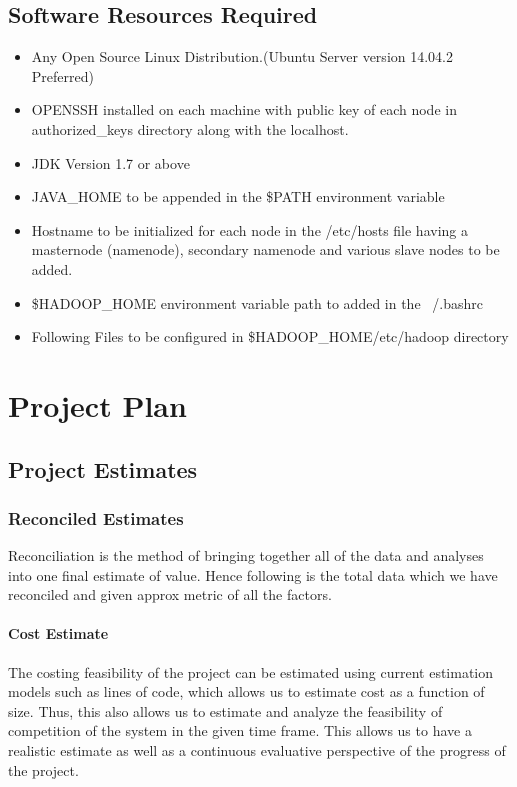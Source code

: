 \documentclass[oneside,a4paper,12pt]{report}
\begin{document}
\section{Software Resources Required}
\begin{itemize}
\item Any Open Source Linux Distribution.(Ubuntu Server version 14.04.2 Preferred)
\item OPENSSH installed on each machine with public key of each node in authorized\_keys directory along with the localhost.
\item JDK Version 1.7 or above
\item JAVA\_HOME to be appended in the \$PATH environment variable
\item Hostname to be initialized for each node in the /etc/hosts file having a masternode (namenode), secondary namenode and various slave nodes to be added.
\item \$HADOOP\_HOME environment variable path to added in the ~/.bashrc 
\item Following Files to be configured in \$HADOOP\_HOME/etc/hadoop directory
\end{itemize}

\chapter{Project Plan}

\section{Project Estimates}
             
\subsection{Reconciled Estimates}
Reconciliation is the method of bringing together all of the data and analyses into one final estimate of value. Hence following is the total data which we have reconciled and given approx metric of all the factors. \\

\subsubsection{Cost Estimate}
The costing feasibility of the project can be estimated using current estimation models such as lines of code, which allows us to estimate cost as a function of size. Thus, this also allows us to estimate and analyze the feasibility of competition of the system in the given time frame. This allows us to have a realistic estimate as well as a continuous evaluative perspective of the progress of the project. 
\end{document}

